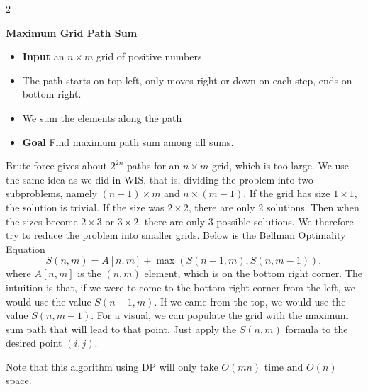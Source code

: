 \begin{multicols}{2}
\begin{leftbar}
    \textbf{Maximum Grid Path Sum}
    \begin{itemize}
        \item \textbf{Input} an $n \times m$ grid of positive numbers.
        \item The path starts on top left, only moves right or down on each step, ends on bottom right.
        \item We sum the elements along the path
        \item \textbf{Goal} Find maximum path sum among all sums.
    \end{itemize}
\end{leftbar}

\begin{analysis}
    Brute force gives about $2^{2n}$ paths for an $n \times m$ grid, which is too large. We use the same idea as we did in WIS, that is, dividing the problem into two subproblems, namely $(n -1) \times m$ and $n \times (m - 1)$. If the grid has size $1 \times 1$, the solution is trivial. If the size was $2\times 2$, there are only 2 solutions. Then when the sizes become $2\times 3$ or $3\times2$, there are only 3 possible solutions. We therefore try to reduce the problem into smaller grids. Below is the Bellman Optimality Equation
    $$
    S(n,m) = A[n,m] + \max(S(n - 1, m), S(n, m - 1)),
    $$
    where $A[n,m]$ is the $(n,m)$ element, which is on the bottom right corner. The intuition is that, if we were to come to the bottom right corner from the left, we would use the value $S(n - 1, m)$. If we came from the top, we would use the value $S(n, m - 1)$. For a visual, we can populate the grid with the maximum sum path that will lead to that point. Just apply the $S(n,m)$ formula to the desired point $(i, j)$. 

    Note that this algorithm using DP will only take $O(mn)$ time and $O(n)$ space. 
\end{analysis}
\end{multicols}

\newpage
